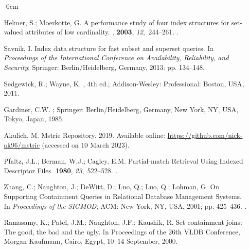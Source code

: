 \documentclass[algorithms,article,accept,pdftex,moreauthors]{Definitions/mdpi}
\begin{document}
\begin{adjustwidth}{-\extralength}{0cm}
\begin{thebibliography}{999}
Helmer, S.; Moerkotte, G.
\newblock A performance study of four index structures for set-valued
  attributes of low cardinality.
, {\bf 2003}, {\em 12},~244--261.
.

Savnik, I.
\newblock Index data structure for fast subset and superset queries.
\newblock In \emph{Proceedings of the International Conference on Availability,
  Reliability, and Security}; Springer: Berlin/Heidelberg, Germany, %
  2013; pp. 134--148.

Sedgewick, R.; Wayne, K.
, 4th ed.; Addison-Wesley: %
 Professional: Boston, USA, 2011.

Gardiner, C.W.
; Springer: Berlin/Heidelberg, Germany, New
  York, NY, USA, Tokyo, Japan, 1985.

Akulich, M.
\newblock Mstrie Repository. 2019. Available online:  \url{https://github.com/nick-ak96/mstrie} (accessed %
 on 10 March 2023).

Pfaltz, J.L.; Berman, W.J.; Cagley, E.M.
\newblock Partial-match Retrieval Using Indexed Descriptor Files.
 {\bf 1980}, {\em 23},~522--528.
.

Zhang, C.; Naughton, J.; DeWitt, D.; Luo, Q.; Luo, Q.; Lohman, G.
\newblock On Supporting Containment Queries in Relational Database Management
  Systems.
\newblock In \emph{Proceedings of the  SIGMOD}; ACM: New York, NY, USA,
  2001; pp. 425--436.
.

Ramasamy, K.; Patel, J.M.; Naughton, J.F.; Kaushik, R.
\newblock Set containment joins: The good, the bad and the ugly.
\newblock In Proceedings of the 26th VLDB Conference, Morgan Kaufmann, Cairo, Egypt, 10--14 September, 2000. %


\end{thebibliography}
\end{adjustwidth}
\end{document}
